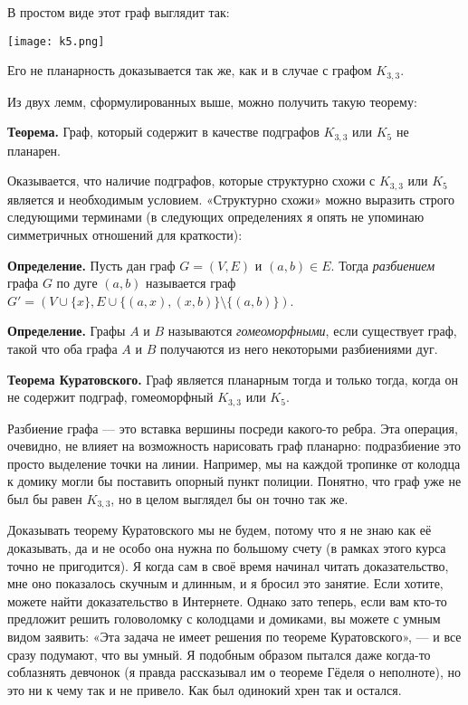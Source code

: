 В простом виде этот граф выглядит так:

\texttt{[image: k5.png]}

Его не планарность доказывается так же, как и в случае с графом $K_{3, 3}$.

Из двух лемм, сформулированных выше, можно получить такую теорему:

{\bfseries Теорема.} Граф, который содержит в качестве подграфов $K_{3, 3}$ или $K_5$ не планарен.

Оказывается, что наличие подграфов, которые структурно схожи с $K_{3, 3}$ или $K_5$ является и необходимым условием. «Структурно схожи» можно выразить строго следующими терминами (в следующих определениях я опять не упоминаю симметричных отношений для краткости):

{\bfseries Определение.} Пусть дан граф $G=(V, E)$ и $(a, b) \in E$. Тогда {\slshape разбиением} графа $G$ по дуге $(a, b)$ называется граф $G' = (V\cup\{x\}, E\cup\{(a, x), (x, b)\}\setminus\{(a, b)\})$.

{\bfseries Определение.} Графы $A$ и $B$ называются {\slshape гомеоморфными}, если существует граф, такой что оба графа $A$ и $B$ получаются из него некоторыми разбиениями дуг.

{\bfseries Теорема Куратовского.} Граф является планарным тогда и только тогда, когда он не содержит подграф, гомеоморфный $K_{3, 3}$ или $K_5$.

Разбиение графа — это вставка вершины посреди какого-то ребра. Эта операция, очевидно, не влияет на возможность нарисовать граф планарно: подразбиение это просто выделение точки на линии. Например, мы на каждой тропинке от колодца к домику могли бы поставить опорный пункт полиции. Понятно, что граф уже не был бы равен $K_{3, 3}$, но в целом выглядел бы он точно так же.

Доказывать теорему Куратовского мы не будем, потому что я не знаю как её доказывать, да и не особо она нужна по большому счету (в рамках этого курса точно не пригодится). Я когда сам в своё время начинал читать доказательство, мне оно показалось скучным и длинным, и я бросил это занятие. Если хотите, можете найти доказательство в Интернете. Однако зато теперь, если вам кто-то предложит решить головоломку с колодцами и домиками, вы можете с умным видом заявить: «Эта задача не имеет решения по теореме Куратовского», — и все сразу подумают, что вы умный. Я подобным образом пытался даже когда-то соблазнять девчонок (я правда рассказывал им о теореме Гёделя о неполноте), но это ни к чему так и не привело. Как был одинокий хрен так и остался.

